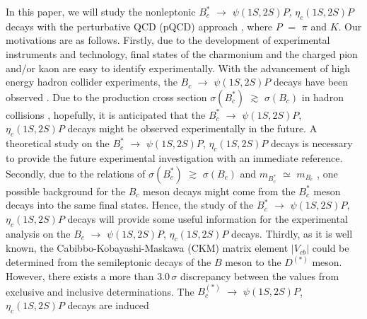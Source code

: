 \documentclass[preprint,superscriptaddress,nofootinbib]{revtex4}
\begin{document}
  In this paper, we will study the nonleptonic $B_{c}^{\ast}$
  ${\to}$ ${\psi}(1S,2S)P$, ${\eta}_{c}(1S,2S)P$ decays with the
  perturbative QCD (pQCD) approach \cite{pqcd1,pqcd2,pqcd3},
  where $P$ $=$ ${\pi}$ and $K$.
  Our motivations are as follows.
  Firstly, due to the development of experimental instruments and technology,
  final states of the charmonium and the charged pion and/or kaon
  are easy to identify experimentally.
  With the advancement of high energy hadron collider experiments,
  the $B_{c}$ ${\to}$ ${\psi}(1S,2S)P$ decays have been observed
  \cite{pdg,prl101.012001,prd87.011101,jhep1501.063,prd90.032009,jhep1605.153,prd92.072007}.
  Due to the production cross section ${\sigma}(B_{c}^{\ast})$ ${\gtrsim}$
  ${\sigma}(B_{c})$ in hadron collisions \cite{plb364,prd54.4344,epjc38.267,prd72.114009},
  hopefully, it is anticipated that the $B_{c}^{\ast}$ ${\to}$ ${\psi}(1S,2S)P$,
  ${\eta}_{c}(1S,2S)P$ decays might be observed experimentally in the future.
  A theoretical study on the $B_{c}^{\ast}$ ${\to}$ ${\psi}(1S,2S)P$,
  ${\eta}_{c}(1S,2S)P$ decays is necessary to provide the future experimental
  investigation with an immediate reference.
  Secondly, due to the relations of ${\sigma}(B_{c}^{\ast})$ ${\gtrsim}$ ${\sigma}(B_{c})$
  and $m_{B_{c}^{\ast}}$ ${\simeq}$ $m_{B_{c}}$ \cite{prd86.094510},
  one possible background for the $B_{c}$ meson decays might come from the $B_{c}^{\ast}$
  meson decays into the same final states.
  Hence, the study of the $B_{c}^{\ast}$ ${\to}$ ${\psi}(1S,2S)P$, ${\eta}_{c}(1S,2S)P$
  decays will provide some useful information for the experimental analysis on
  the $B_{c}$ ${\to}$ ${\psi}(1S,2S)P$, ${\eta}_{c}(1S,2S)P$ decays.
  Thirdly, as it is well known, the Cabibbo-Kobayashi-Maskawa (CKM) matrix element
  ${\vert}V_{cb}{\vert}$ could be determined from the semileptonic
  decays of the $B$ meson to the $D^{(\ast)}$ meson.
  However, there exists a more than $3.0\,{\sigma}$ discrepancy between the values from
  exclusive and inclusive determinations\footnotemark[1] \cite{pdg}.
  The $B_{c}^{(\ast)}$ ${\to}$ ${\psi}(1S,2S)P$, ${\eta}_{c}(1S,2S)P$ decays are induced
\end{document}
